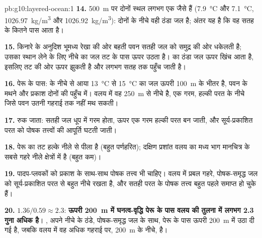 \begin{solution}{pb:g10:layered-ocean:1}
\textbf{14.} \qty{500}{m} पर दोनों स्थल लगभग एक जैसे हैं
(\qty{7.9}{\degreeCelsius} और \qty{7.1}{\degreeCelsius},
\qty{1026.97}{kg/m^3} और \qty{1026.92}{kg/m^3}): दोनों के नीचे वही ठंडा जल है;
अंतर यह है कि वह सतह के कितने पास आता है।

\textbf{15.} किनारे के अनुदिश भूमध्य रेखा की ओर बहती पवन
सतही जल को समुद्र की ओर धकेलती है; उसका स्थान लेने के लिए नीचे का जल तट के पास ऊपर
उठता है।  का ठंडा जल ऊपर खिंच आता है, इसलिए 
तट की ओर ऊपर झुकती है और लगभग सतह तक पहुँच जाती है।

\textbf{16.} पेरू के पास:  के नीचे से आया \qty{13}{\degreeCelsius} से
\qty{15}{\degreeCelsius} का जल ऊपरी
\qty{100}{m} के भीतर है, पवन के मथने और प्रकाश दोनों की पहुँच में।
वलय में वह \qty{250}{m} से नीचे है, एक गरम, हल्की परत के नीचे जिसे पवन
उतनी गहराई तक नहीं मथ सकती।

\textbf{17.}  रुक जाता: सतही जल धूप में गरम होता,
ऊपर एक गरम हल्की परत बन जाती, और सूर्य-प्रकाशित परत को पोषक तत्त्वों की
आपूर्ति घटती जाती।

\textbf{18.} पेरू का तट हल्के नीले से पीला है (बहुत पर्णहरित);
दक्षिण प्रशांत वलय का मध्य भाग मानचित्र के सबसे गहरे नीले क्षेत्रों में है
(बहुत कम)।

\textbf{19.} पादप-प्लवकों को प्रकाश के साथ-साथ पोषक तत्त्व भी चाहिए। वलय में
प्रबल  गहरे, पोषक-समृद्ध जल को सूर्य-प्रकाशित परत से बहुत नीचे
रखता है, और सतही परत के पोषक तत्त्व बहुत पहले समाप्त हो चुके हैं।

\textbf{20.} $1.36/0.59 \approx 2.3$: \textbf{ऊपरी \qty{200}{m} में घनत्व-वृद्धि
पेरू के पास वलय की तुलना में लगभग 2.3 गुना अधिक है}।
, अपने नीचे के ठंडे, पोषक-समृद्ध जल के साथ, पेरू के पास
ऊपरी \qty{200}{m} में उठा दी गई है, जबकि वलय में वह अधिक गहराई पर,
\qty{200}{m} के नीचे, है।
\end{solution}
